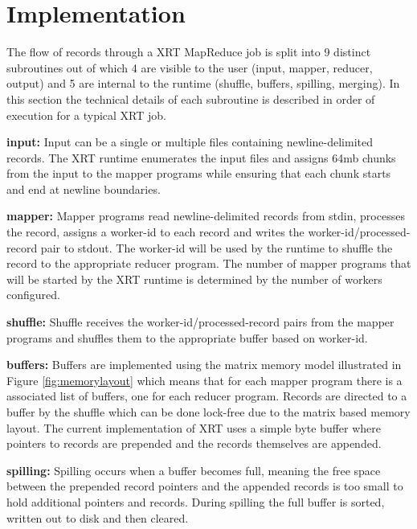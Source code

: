 \documentclass[twocolumn,11px]{article}       %
\begin{document}
\section{Implementation} \label{sec:impl}

The flow of records through a XRT MapReduce job is split into 9 distinct subroutines out of which 4 are visible to the user (input, mapper, reducer, output) and 5 are internal to the runtime (shuffle, buffers, spilling, merging).
In this section the technical details of each subroutine is described in order of execution for a typical XRT job.

\bigskip
\noindent
\textbf{input:} Input can be a single or multiple files containing newline-delimited records.
The XRT runtime enumerates the input files and assigns 64mb chunks from the input to the mapper programs while ensuring that each chunk starts and end at newline boundaries.

\bigskip
\noindent
\textbf{mapper:} Mapper programs read newline-delimited records from stdin, processes the record, assigns a worker-id to each record and writes the worker-id/processed-record pair to stdout.
The worker-id will be used by the runtime to shuffle the record to the appropriate reducer program.
The number of mapper programs that will be started by the XRT runtime is determined by the number of workers configured.

\bigskip
\noindent
\textbf{shuffle:} Shuffle receives the worker-id/processed-record pairs from the mapper programs and shuffles them to the appropriate buffer based on worker-id.

\bigskip
\noindent
\textbf{buffers:} Buffers are implemented using the matrix memory model illustrated in Figure \ref{fig:memorylayout} which means that for each mapper program there is a associated list of buffers, one for each reducer program.
Records are directed to a buffer by the shuffle which can be done lock-free due to the matrix based memory layout.
The current implementation of XRT uses a simple byte buffer where pointers to records are prepended and the records themselves are appended.

\bigskip
\noindent
\textbf{spilling:} Spilling occurs when a buffer becomes full, meaning the free space between the prepended record pointers and the appended records is too small to hold additional pointers and records.
During spilling the full buffer is sorted, written out to disk and then cleared.
\end{document}
